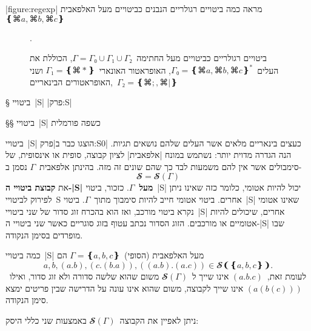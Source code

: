 |figure:regexp| מראה כמה ביטויים רגולריים הנבנים כביטויים מעל
האלפאבית~$❴⌘a,⌘b,⌘c❵$
\begin{figure}
  \centering
  \caption{ביטויים רגולריים כביטויים מעל החתימה~$Γ=Γ₀∪Γ₁∪Γ₂$, הכוללת את
  העלים~$Γ₀=❴⌘a, ⌘b, ⌘c❵^*$, האופראטור האונארי~$Γ₁=❴⌘*❵$ ושני האופראטורים
  הבינאריים,~$Γ₂=❴⌘;,⌘|❵$}.
  \label{figure:regexp}
\end{figure}
§ ביטויי~\E|S|
|פרק:S|

§§ ביטויי~\E|S| כשפה פורמלית

ביטויי~\E|S| הוצגו כבר ב|פרק:S0| כעצים בינאריים מלאים אשר העלים שלהם נושאים
תגיות. הנה הגדרה מדוית יותר: נשתמש במונח \ע|אלפאבית| לציון קבוצה, סופית או
אינסופית, של סימבולים אשר אין להם משמעות לבד כך שהם שונים זה מזה. בהינתן
אלפאבית~$Γ$ נסמן ב- \[
𝓢=𝓢(Γ)
\]
את \textbf{קבוצת ביטויי ה-\E|S| מעל~$Γ$}. כזכור, ביטוי~\E|S|
יכול להיות אטומי, כלומר כזה שאינו ניתן לפירוק לביטויי~S אחרים. ביטוי אטומי חייב
להיות סימבוך מתוך~$Γ$. ביטוי~\E|S| שאינו אטומי נקרא ביטוי מורכב, ואז הוא בהכרח
זוג סדור של שני ביטויי~\E|S| אחרים, שיכולים להיות אטומיים או מורכבים. הזוג
הסדור נכתב עטוף בזוג סוגריים כאשר שני ביטויי ה-\E|S| שבו מופרדים בסימן הנקודה.

כמה ביטויי~\E|S| מעל האלפאבית (הסופי)~$Γ=❴a,b,c❵$ הם \[
  a,b,(a.b),(c.(b.a)),((a.b).(a.c))∈𝓢❨❴a,b,c❵❩.
\] לעומת זאת,~$(a.b.c)$ אינו שייך ל~$𝓢(Γ)$ משום שהוא שלשה סדורה ולא זוג סדור,
ואילו~$(a(b(c)))$ אינו שייך לקבוצה, משום שהוא אינו עונה על הדרישה שבין פריטים
ימצא סימן הנקודה.

ניתן לאפיין את הקבוצה~$𝓢(Γ)$ באמצעות שני כללי היסק:


